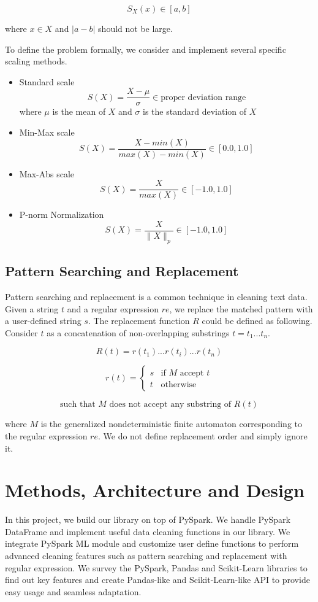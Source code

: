\documentclass[sigconf]{acmart}
\begin{document}
\[ S_X(x) \in [a, b]\] 

where $x \in X$ and $|a - b|$ should not be large.

To define the problem formally, we consider and implement several specific scaling methods.
\begin{itemize}
	\item{Standard scale}
		\[ S(X) = \dfrac{X-\mu}{\sigma} \in \text{proper deviation range}\]
		where $\mu$ is the mean of $X$ and $\sigma$ is the standard deviation of $X$
	\item{Min-Max scale}
		\[ S(X) = \dfrac{X-min(X)}{max(X) - min(X)}\in [0.0, 1.0] \]
	\item{Max-Abs scale}
		\[ S(X) = \dfrac{X}{max(X)} \in [-1.0, 1.0] \]
	\item{P-norm Normalization}
		\[ S(X) = \dfrac{X}{\|X\|_{p}} \in [-1.0, 1.0]\]
\end{itemize}

\subsection{Pattern Searching and Replacement}
Pattern searching and replacement is a common technique in cleaning text data. Given a string $t$ and a regular expression\cite{theory_com} $re$, we replace the matched pattern with a user-defined string $s$. The replacement function $R$ could be defined as following.
Consider $t$ as a concatenation of non-overlapping substrings $t = t_1...t_n$.

\[ R(t) =  r(t_1)...r(t_i)...r(t_n)\]

\[r(t) = \begin{cases} s & \text{if $M$ accept $t$} \\ t & \text{otherwise} \end{cases}\]

\[\text{such that $M$ does not accept any substring of } R(t)\]

where $M$ is the generalized nondeterministic finite automaton\cite{theory_com} corresponding to the regular expression $re$. We do not define replacement order and simply ignore it.


\section{Methods, Architecture and Design}
In this project, we build our library on top of PySpark. We handle PySpark DataFrame and implement useful data cleaning functions in our library. We integrate PySpark ML module and customize user define functions to perform advanced cleaning features such as pattern searching and replacement with regular expression. We survey the PySpark\cite{pyspark}, Pandas\cite{pandas} and Scikit-Learn\cite{scikit-learn} libraries to find out key features and create Pandas-like and Scikit-Learn-like API to provide easy usage and seamless adaptation.
\end{document}
